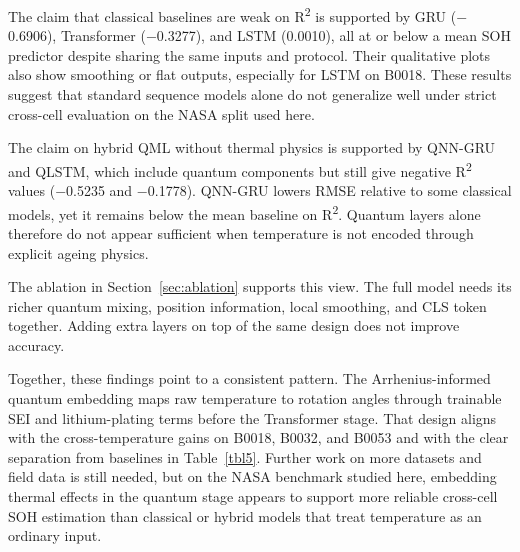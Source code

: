 \documentclass[a4paper,fleqn]{cas-sc}
\begin{document}
The claim that classical baselines are weak on R\textsuperscript{2} is supported by GRU ($-$0.6906), Transformer ($-$0.3277), and LSTM (0.0010), all at or below a mean SOH predictor despite sharing the same inputs and protocol. Their qualitative plots also show smoothing or flat outputs, especially for LSTM on B0018. These results suggest that standard sequence models alone do not generalize well under strict cross-cell evaluation on the NASA split used here.

The claim on hybrid QML without thermal physics is supported by QNN-GRU and QLSTM, which include quantum components but still give negative R\textsuperscript{2} values ($-$0.5235 and $-$0.1778). QNN-GRU lowers RMSE relative to some classical models, yet it remains below the mean baseline on R\textsuperscript{2}. Quantum layers alone therefore do not appear sufficient when temperature is not encoded through explicit ageing physics.

The ablation in Section~\ref{sec:ablation} supports this view. The full model needs its richer quantum mixing, position information, local smoothing, and CLS token together. Adding extra layers on top of the same design does not improve accuracy.

Together, these findings point to a consistent pattern. The Arrhenius-informed quantum embedding maps raw temperature to rotation angles through trainable SEI and lithium-plating terms before the Transformer stage. That design aligns with the cross-temperature gains on B0018, B0032, and B0053 and with the clear separation from baselines in Table~\ref{tbl5}. Further work on more datasets and field data is still needed, but on the NASA benchmark studied here, embedding thermal effects in the quantum stage appears to support more reliable cross-cell SOH estimation than classical or hybrid models that treat temperature as an ordinary input.

\noindent{}
\end{document}
